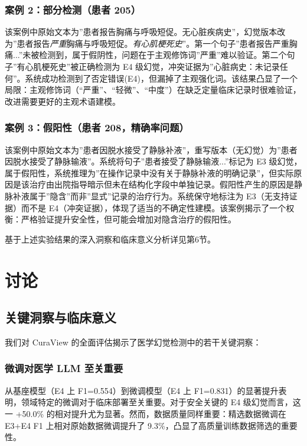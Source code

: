 \documentclass[11pt]{article}
\begin{document}
\subsubsection{案例 2：部分检测（患者 205）}

该案例中原始文本为''患者报告胸痛与呼吸短促。无心脏疾病史''，幻觉版本改为''患者报告\emph{严重}胸痛与呼吸短促。\emph{有心肌梗死史}''。第一个句子''患者报告严重胸痛...''未被检测到，属于假阴性，问题在于主观修饰词''严重''难以验证。第二个句子''有心肌梗死史''被正确检测为 E4 级幻觉，冲突证据为''心脏病史：未记录任何''。系统成功检测到了否定错误(E4)，但漏掉了主观强化词。该结果凸显了一个局限：主观修饰词（``严重''、``轻微''、``中度''）在缺乏定量临床记录时很难验证，改进需要更好的主观术语建模。

\subsubsection{案例 3：假阳性（患者 208，精确率问题）}

该案例中原始文本为''患者因脱水接受了静脉补液''，重写版本（无幻觉）为''患者因脱水接受了静脉输液''。系统将句子''患者接受了静脉输液...''标记为 E3 级幻觉，属于假阳性，系统推理为''在操作记录中没有关于静脉补液的明确记录''，但实际原因是该治疗由出院指导暗示但未在结构化字段中单独记录。假阳性产生的原因是静脉补液属于''隐含''而非''显式''记录的治疗行为。系统保守地标注为 E3（无支持证据）而不是 E4（冲突证据），体现了适当的不确定性建模。该案例揭示了一个权衡：严格验证提升安全性，但可能会增加对隐含治疗的假阳性。

基于上述实验结果的深入洞察和临床意义分析详见第6节。

\section{讨论}
\subsection{关键洞察与临床意义}

我们对 CuraView 的全面评估揭示了医学幻觉检测中的若干关键洞察：

\subsubsection{微调对医学 LLM 至关重要}

从基座模型（E4 上 F1=0.554）到微调模型（E4 上 F1=0.831）的显著提升表明，领域特定的微调对于临床部署至关重要。对于安全关键的 E4 级幻觉而言，这一 +50.0\% 的相对提升尤为显著。然而，数据质量同样重要：精选数据微调在 E3+E4 F1 上相对原始数据微调提升了 9.3\%，凸显了高质量训练数据筛选的重要性。
\end{document}
